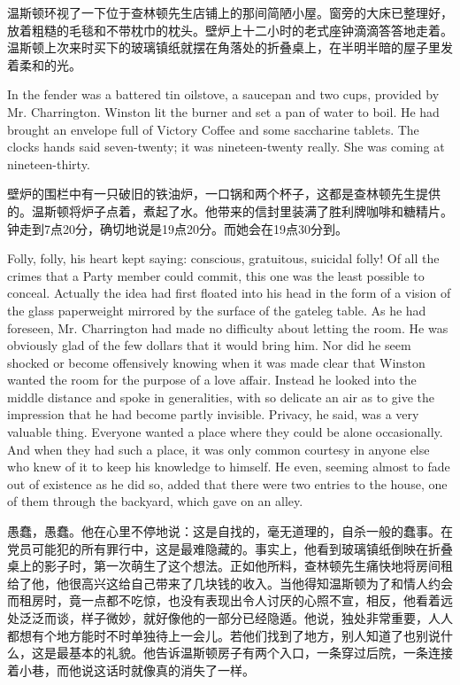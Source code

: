 \begin{paracol}{2}
\switchcolumn

温斯顿环视了一下位于查林顿先生店铺上的那间简陋小屋。窗旁的大床已整理好，放着粗糙的毛毯和不带枕巾的枕头。壁炉上十二小时的老式座钟滴滴答答地走着。温斯顿上次来时买下的玻璃镇纸就摆在角落处的折叠桌上，在半明半暗的屋子里发着柔和的光。

\switchcolumn*

In the fender was a battered tin oilstove, a saucepan and two cups,
provided by Mr. Charrington. Winston lit the burner and set a pan of
water to boil. He had brought an envelope full of Victory Coffee and
some saccharine tablets. The clock\textquotesingle s hands said
seven-twenty; it was nineteen-twenty really. She was coming at
nineteen-thirty.

\switchcolumn

壁炉的围栏中有一只破旧的铁油炉，一口锅和两个杯子，这都是查林顿先生提供的。温斯顿将炉子点着，煮起了水。他带来的信封里装满了胜利牌咖啡和糖精片。钟走到7点20分，确切地说是19点20分。而她会在19点30分到。

\switchcolumn*

Folly, folly, his heart kept saying: conscious, gratuitous, suicidal
folly! Of all the crimes that a Party member could commit, this one was
the least possible to conceal. Actually the idea had first floated into
his head in the form of a vision of the glass paperweight mirrored by
the surface of the gateleg table. As he had foreseen, Mr. Charrington
had made no difficulty about letting the room. He was obviously glad of
the few dollars that it would bring him. Nor did he seem shocked or
become offensively knowing when it was made clear that Winston wanted
the room for the purpose of a love affair. Instead he looked into the
middle distance and spoke in generalities, with so delicate an air as to
give the impression that he had become partly invisible. Privacy, he
said, was a very valuable thing. Everyone wanted a place where they
could be alone occasionally. And when they had such a place, it was only
common courtesy in anyone else who knew of it to keep his knowledge to
himself. He even, seeming almost to fade out of existence as he did so,
added that there were two entries to the house, one of them through the
backyard, which gave on an alley.

\switchcolumn

愚蠢，愚蠢。他在心里不停地说：这是自找的，毫无道理的，自杀一般的蠢事。在党员可能犯的所有罪行中，这是最难隐藏的。事实上，他看到玻璃镇纸倒映在折叠桌上的影子时，第一次萌生了这个想法。正如他所料，查林顿先生痛快地将房间租给了他，他很高兴这给自己带来了几块钱的收入。当他得知温斯顿为了和情人约会而租房时，竟一点都不吃惊，也没有表现出令人讨厌的心照不宣，相反，他看着远处泛泛而谈，样子微妙，就好像他的一部分已经隐遁。他说，独处非常重要，人人都想有个地方能时不时单独待上一会儿。若他们找到了地方，别人知道了也别说什么，这是最基本的礼貌。他告诉温斯顿房子有两个入口，一条穿过后院，一条连接着小巷，而他说这话时就像真的消失了一样。


\end{paracol}
